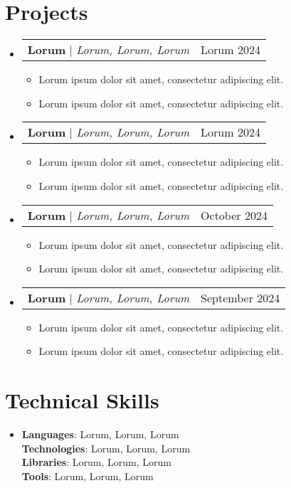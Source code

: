 \documentclass[letterpaper,10pt]{article}
\makeatletter
\newcommand{\resumeItem}[1]{\item\small{{#1 \vspace{-2pt}}}}
\newcommand{\resumeProjectHeading}[2]{\item \begin{tabular*}{\textwidth}{l@{\extracolsep{\fill}}r} \small#1 & #2 \end{tabular*}\vspace{-5pt}}
\newcommand{\resumeSubHeadingListStart}{\begin{itemize}[leftmargin=0.15in, label={}]}
\newcommand{\resumeSubHeadingListEnd}{\end{itemize}}
\newcommand{\resumeItemListStart}{\begin{itemize}[leftmargin=0.5in]}  %
\newcommand{\resumeItemListEnd}{\end{itemize}\vspace{-5pt}}
\makeatother
\begin{document}
\section{Projects}
  \resumeSubHeadingListStart
   \resumeProjectHeading
      {\textbf{Lorum } $|$ \emph{Lorum, Lorum, Lorum}}{Lorum 2024}
      \resumeItemListStart
        \resumeItem{Lorum ipsum dolor sit amet, consectetur adipiscing elit.}
        \resumeItem{Lorum ipsum dolor sit amet, consectetur adipiscing elit.}
      \resumeItemListEnd

    \resumeProjectHeading
      {\textbf{Lorum} $|$ \emph{Lorum, Lorum, Lorum}}{Lorum 2024}
      \resumeItemListStart
        \resumeItem{Lorum ipsum dolor sit amet, consectetur adipiscing elit.}
        \resumeItem{Lorum ipsum dolor sit amet, consectetur adipiscing elit.}
      \resumeItemListEnd

    \resumeProjectHeading
      {\textbf{Lorum} $|$ \emph{Lorum, Lorum, Lorum}}{October 2024}
      \resumeItemListStart
        \resumeItem{Lorum ipsum dolor sit amet, consectetur adipiscing elit.}
        \resumeItem{Lorum ipsum dolor sit amet, consectetur adipiscing elit.}
      \resumeItemListEnd

    \resumeProjectHeading
    {\textbf{Lorum} $|$ \emph{Lorum, Lorum, Lorum}}{September 2024}
      \resumeItemListStart
        \resumeItem{Lorum ipsum dolor sit amet, consectetur adipiscing elit.}
        \resumeItem{Lorum ipsum dolor sit amet, consectetur adipiscing elit.}
      \resumeItemListEnd

  \resumeSubHeadingListEnd

\section{Technical Skills}
  \resumeSubHeadingListStart
    \item{
      \textbf{Languages}{: Lorum, Lorum, Lorum} \\ %
      \textbf{Technologies}{: Lorum, Lorum, Lorum} \\%
      \textbf{Libraries}{: Lorum, Lorum, Lorum} \\%
      \textbf{Tools}{: Lorum, Lorum, Lorum}
    }
  \resumeSubHeadingListEnd

\end{document}
